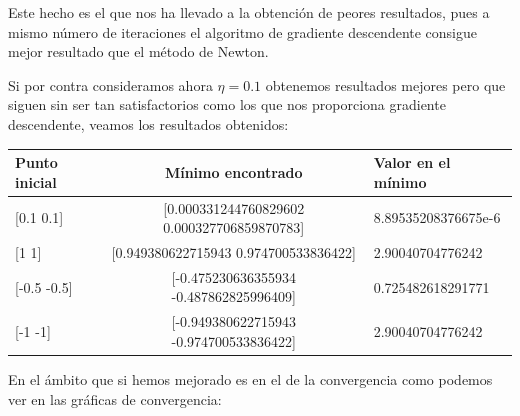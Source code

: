 \documentclass[12pt,a4paper]{article}
\begin{document}
Este hecho es el que nos ha llevado a la obtención de peores resultados, pues a mismo número de iteraciones el algoritmo de gradiente descendente consigue mejor resultado que el método de Newton.

Si por contra consideramos ahora $\eta=0.1$ obtenemos resultados mejores pero que siguen sin ser tan satisfactorios como los que nos proporciona gradiente descendente, veamos los resultados obtenidos:

\begin{table}[H]
	\begin{tabular}{|l|c|l|}
		\hline
		{\textbf{Punto inicial}} & {\textbf{Mínimo encontrado}}            & {\textbf{Valor en el mínimo}} \\ \hline \hline
		{[}0.1 0.1{]}                & {[}0.000331244760829602 0.000327706859870783{]}  & 8.89535208376675e-6                          \\ \hline
		{[}1 1{]}                    & {[}0.949380622715943 0.974700533836422{]}    & 2.90040704776242                          \\ \hline
		{[}-0.5 -0.5{]}              & {[}-0.475230636355934 -0.487862825996409{]} & 0.725482618291771                          \\ \hline
		{[}-1 -1{]}                  & {[}-0.949380622715943 -0.974700533836422{]}  & 2.90040704776242                          \\ \hline
	\end{tabular}
\end{table}

En el ámbito que si hemos mejorado es en el de la convergencia como podemos ver en las gráficas de convergencia:
\end{document}
